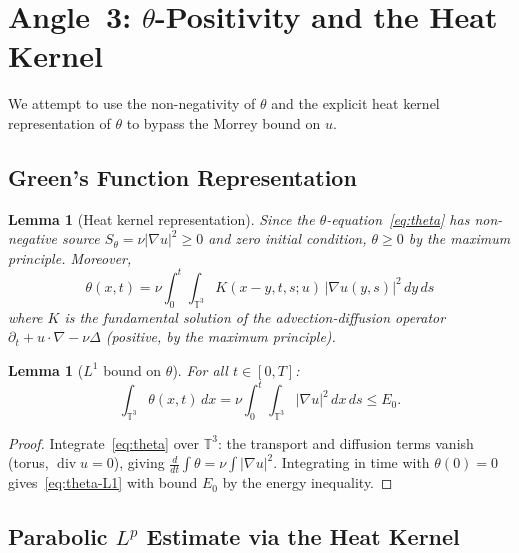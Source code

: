 \documentclass[11pt]{article}
\newtheorem{lemma}[theorem]{Lemma}
\theoremstyle{definition}
\theoremstyle{remark}
\newcommand{\T}{\mathbb{T}}
\newcommand{\grad}{\nabla}
\newcommand{\divg}{\operatorname{div}}
\begin{document}
\section{Angle~3: $\theta$-Positivity and the Heat Kernel}
\label{sec:theta-heat}

We attempt to use the non-negativity of $\theta$ and the explicit heat
kernel representation of $\theta$ to bypass the Morrey bound on $u$.

\subsection{Green's Function Representation}

\begin{lemma}[Heat kernel representation]\label{lem:theta-GF}
  Since the $\theta$-equation~\eqref{eq:theta} has non-negative source
  $S_\theta = \nu|\grad u|^2\geq 0$ and zero initial condition,
  $\theta\geq 0$ by the maximum principle.  Moreover,
  \begin{equation}\label{eq:theta-GF}
    \theta(x,t)
    = \nu\int_0^t\!\!\int_{\T^3} K(x-y,t,s;u)\,|\grad u(y,s)|^2\,dy\,ds
  \end{equation}
  where $K$ is the fundamental solution of the advection-diffusion
  operator $\partial_t + u\cdot\grad - \nu\Delta$ (positive, by
  the maximum principle).
\end{lemma}

\begin{lemma}[$L^1$ bound on $\theta$]\label{lem:theta-L1}
  For all $t\in[0,T]$:
  \begin{equation}\label{eq:theta-L1}
    \int_{\T^3}\theta(x,t)\,dx = \nu\int_0^t\!\!\int_{\T^3}|\grad u|^2\,dx\,ds
    \leq E_0.
  \end{equation}
\end{lemma}

\begin{proof}
  Integrate~\eqref{eq:theta} over $\T^3$: the transport and diffusion
  terms vanish (torus, $\divg u=0$), giving $\frac{d}{dt}\int\theta
  = \nu\int|\grad u|^2$.  Integrating in time with $\theta(0)=0$
  gives~\eqref{eq:theta-L1} with bound $E_0$ by the energy inequality.
\end{proof}

\subsection{Parabolic $L^p$ Estimate via the Heat Kernel}
\end{document}
